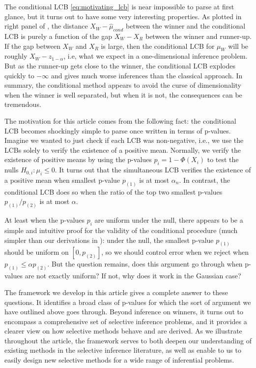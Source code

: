 \documentclass{article}
\begin{document}
The conditional LCB \eqref{eq:motivating_lcb} is near impossible to parse at first glance, but it turns out to have some very interesting properties. As plotted in right panel of , the distance $X_W - \hat{\mu}_{cond}$ between the winner and the conditional LCB is purely a function of the gap $X_W - X_R$ between the winner and runner-up. If the gap between $X_W$ and $X_R$ is large, then the conditional LCB for $\mu_W$ will be roughly $X_{W} - z_{1-\alpha}$, i.e, what we expect in a one-dimensional inference problem. But as the runner-up gets close to the winner, the conditional LCB explodes quickly to $-\infty$ and gives much worse inferences than the classical approach. In summary, the conditional method appears to avoid the curse of dimensionality when the winner is well separated, but when it is not, the consequences can be tremendous. 

The motivation for this article comes from the following fact: the conditional LCB becomes shockingly simple to parse once written in terms of p-values. Imagine we wanted to just check if each LCB was non-negative, i.e., we use the LCBs solely to verify the existence of a positive mean. Normally, we verify the existence of positive means by using the  p-values $p_i = 1 - \Phi(X_i)$ to test the nulls $H_{0, i} : \mu_i \leq 0$. It turns out that the simultaneous LCB verifies the existence of a positive mean when smallest p-value $p_{(1)}$ is at most $\alpha_n$. In contrast, the conditional LCB does so when the ratio of the top two smallest p-values $p_{(1)}/p_{(2)}$ is at most $\alpha$. 

At least when the p-values $p_i$ are uniform under the null, there appears to be a simple and intuitive proof for the validity of the conditional procedure (much simpler than our derivations in ): under the null, the smallest p-value $p_{(1)}$ should be uniform on $[0, p_{(2)}]$, so we should control error when we reject when $p_{(1)} \leq \alpha p_{(2)}$. But the question remains, does this argument go through when p-values are not exactly uniform? If not, why does it work in the Gaussian case?

The framework we develop in this article gives a complete answer to these questions. It identifies a broad class of p-values for which the sort of argument we have outlined above goes through. Beyond inference on winners, it turns out to encompass a comprehensive set of selective inference problems, and it provides a clearer view on how selective methods behave and are derived. As we illustrate throughout the article, the framework serves to both deepen our understanding of existing methods in the selective inference literature, as well as enable to us to easily design new selective methods for a wide range of inferential problems. 
\end{document}
